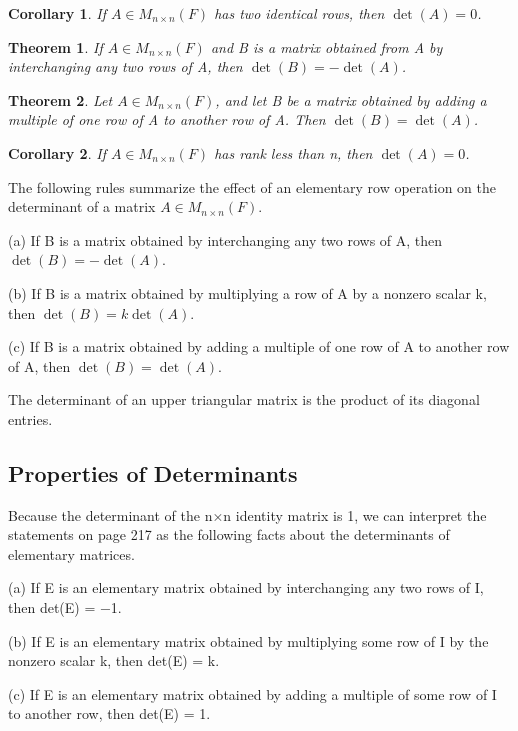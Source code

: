 \documentclass{article}
\theoremstyle{plain}
\newtheorem{theorem}{Theorem}[section]
\newtheorem*{corollary}{Corollary}
\theoremstyle{plain} %
\begin{document}
\begin{corollary}
  If $A \in M_{n\times n}(F)$ has two identical rows, then $\det(A)=0$.
\end{corollary}

\begin{theorem}
  If $A \in M_{n\times n}(F)$ and B is a matrix obtained from A by interchanging any two rows of A, then $\det(B) = − \det(A)$.
\end{theorem}

\begin{theorem}
  Let $A \in M_{n\times n}(F)$, and let B be a matrix obtained by adding a multiple of one row of A to another row of A. Then $\det(B) = \det(A)$.
\end{theorem}

\begin{corollary}
  If $A \in M_{n\times n}(F)$ has rank less than n, then $\det(A)=0$.
\end{corollary}

The following rules summarize the effect of an elementary row operation on the determinant of a matrix $A \in M_{n\times n}(F)$.

(a) If B is a matrix obtained by interchanging any two rows of A, then $\det(B) = − \det(A)$.

(b) If B is a matrix obtained by multiplying a row of A by a nonzero scalar k, then $\det(B) = k \det(A)$.

(c) If B is a matrix obtained by adding a multiple of one row of A to another row of A, then $\det(B) = \det(A)$.

The determinant of an upper triangular matrix is the product of its diagonal entries.

\subsection{Properties of Determinants}

Because the determinant of the n×n identity matrix is 1, we can interpret the statements on page 217 as the following facts about the determinants of elementary matrices.

(a) If E is an elementary matrix obtained by interchanging any two rows of I, then det(E) = −1.

(b) If E is an elementary matrix obtained by multiplying some row of I by the nonzero scalar k, then det(E) = k.

(c) If E is an elementary matrix obtained by adding a multiple of some row of I to another row, then det(E) = 1.
\end{document}
